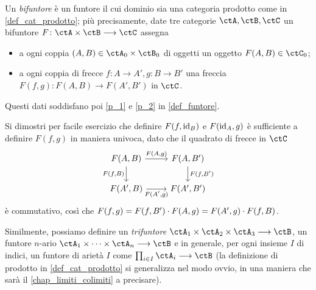 \begin{definition}[Bifuntore]\label{def_bifuntore}
 Un \emph{bifuntore} è un funtore il cui dominio sia una categoria prodotto come in \ref{def_cat_prodotto}; più precisamente, date tre categorie \(\ctA,\ctB,\ctC\) un bifuntore \(F \colon \ctA \times \ctB \fun \ctC\) assegna
 \begin{itemize}
  \item a ogni coppia \((A,B)\in \ctA_0\times\ctB_0\) di oggetti un oggetto \(F(A,B) \in\ctC_0\);
  \item a ogni coppia di frecce \(f \colon A\to A', g \colon B\to B'\) una freccia \(F(f,g) \colon F(A,B)\to F(A',B')\) in \(\ctC\).
 \end{itemize}
 Questi dati soddisfano poi \ref{p_1} e \ref{p_2} in \ref{def_funtore}.
\end{definition}
Si dimostri per facile esercizio che definire \(F(f,\mathrm{id}_B)\) e \(F(\mathrm{id}_A,g)\) è sufficiente a definire \(F(f,g)\) in maniera univoca, dato che il quadrato di frecce in \(\ctC\)
\[
 \begin{tikzcd}
  F(A,B) \ar[r, "{F(A,g)}"]\ar[d, "{F(f,B)}"'] & F(A,B') \ar[d, "{F(f,B')}"]\\
  F(A',B) \ar[r, "{F(A',g)}"'] & F(A',B')
 \end{tikzcd}
\]
è commutativo, così che \(F(f,g)=F(f,B')\cdot F(A,g) = F(A',g)\cdot F(f,B)\).
\begin{notation}
 Similmente, possiamo definire un \emph{trifuntore} \(\ctA_1\times\ctA_2\times\ctA_3\fun\ctB\), un funtore \(n\)-ario \(\ctA_1\times\dots\times\ctA_n\fun\ctB\) e in generale, per ogni insieme \(I\) di indici, un funtore di arietà \(I\) come \(\prod_{i\in I}\ctA_i\fun\ctB\) (la definizione di prodotto in \ref{def_cat_prodotto} si generalizza nel modo ovvio, in una maniera che sarà il \autoref{chap_limiti_colimiti} a precisare).
\end{notation}
